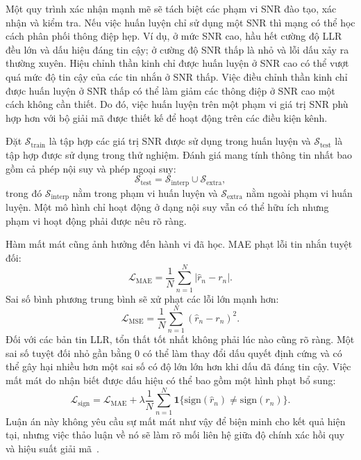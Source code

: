Một quy trình xác nhận mạnh mẽ sẽ tách biệt các phạm vi SNR đào tạo, xác nhận và kiểm tra. Nếu việc huấn luyện chỉ sử dụng một SNR thì mạng có thể học cách phân phối thông điệp hẹp. Ví dụ, ở mức SNR cao, hầu hết cường độ LLR đều lớn và dấu hiệu đáng tin cậy; ở cường độ SNR thấp là nhỏ và lỗi dấu xảy ra thường xuyên. Hiệu chỉnh thần kinh chỉ được huấn luyện ở SNR cao có thể vượt quá mức độ tin cậy của các tin nhắn ở SNR thấp. Việc điều chỉnh thần kinh chỉ được huấn luyện ở SNR thấp có thể làm giảm các thông điệp ở SNR cao một cách không cần thiết. Do đó, việc huấn luyện trên một phạm vi giá trị SNR phù hợp hơn với bộ giải mã được thiết kế để hoạt động trên các điều kiện kênh.

Đặt $\mathcal{S}_{\mathrm{train}}$ là tập hợp các giá trị SNR được sử dụng trong huấn luyện và $\mathcal{S}_{\mathrm{test}}$ là tập hợp được sử dụng trong thử nghiệm. Đánh giá mang tính thông tin nhất bao gồm cả phép nội suy và phép ngoại suy:
\begin{equation}
  \mathcal{S}_{\mathrm{test}}
  =
  \mathcal{S}_{\mathrm{interp}}\cup\mathcal{S}_{\mathrm{extra}},
\end{equation}
trong đó $\mathcal{S}_{\mathrm{interp}}$ nằm trong phạm vi huấn luyện và $\mathcal{S}_{\mathrm{extra}}$ nằm ngoài phạm vi huấn luyện. Một mô hình chỉ hoạt động ở dạng nội suy vẫn có thể hữu ích nhưng phạm vi hoạt động phải được nêu rõ ràng.

Hàm mất mát cũng ảnh hưởng đến hành vi đã học. MAE phạt lỗi tin nhắn tuyệt đối:
\begin{equation}
  \mathcal{L}_{\mathrm{MAE}}=\frac{1}{N}\sum_{n=1}^{N}|\hat{r}_n-r_n|.
\end{equation}
Sai số bình phương trung bình sẽ xử phạt các lỗi lớn mạnh hơn:
\begin{equation}
  \mathcal{L}_{\mathrm{MSE}}=\frac{1}{N}\sum_{n=1}^{N}(\hat{r}_n-r_n)^2.
\end{equation}
Đối với các bản tin LLR, tổn thất tốt nhất không phải lúc nào cũng rõ ràng. Một sai số tuyệt đối nhỏ gần bằng 0 có thể làm thay đổi dấu quyết định cứng và có thể gây hại nhiều hơn một sai số có độ lớn lớn hơn khi dấu đã đáng tin cậy. Việc mất mát do nhận biết được dấu hiệu có thể bao gồm một hình phạt bổ sung:
\begin{equation}
  \mathcal{L}_{\mathrm{sign}}
  =
  \mathcal{L}_{\mathrm{MAE}}
  +
  \lambda
  \frac{1}{N}\sum_{n=1}^{N}
  \mathbf{1}\{\mathrm{sign}(\hat{r}_n)\ne\mathrm{sign}(r_n)\}.
\end{equation}
Luận án này không yêu cầu sự mất mát như vậy để biện minh cho kết quả hiện tại, nhưng việc thảo luận về nó sẽ làm rõ mối liên hệ giữa độ chính xác hồi quy và hiệu suất giải mã~.

